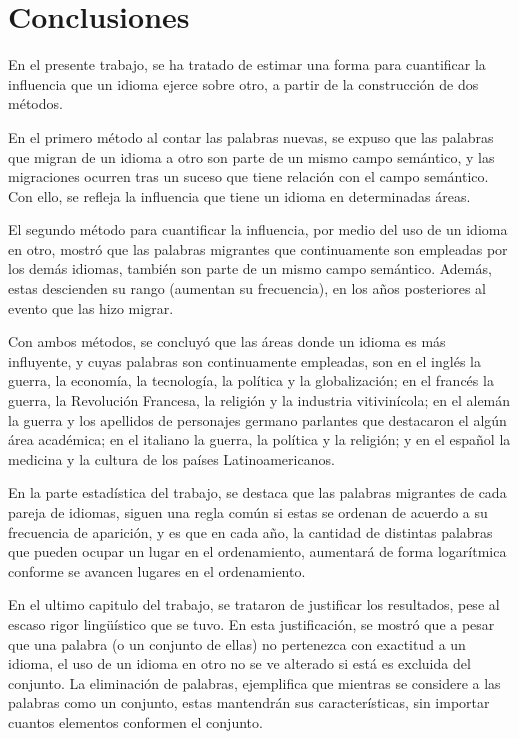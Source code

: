 \chapter{Conclusiones}

En el presente trabajo, se ha tratado de estimar una forma para cuantificar la influencia que un idioma ejerce sobre otro,  a partir de la construcción de dos métodos. 

En el primero método al contar las palabras nuevas, se expuso que las palabras que migran de un idioma a otro son parte de un mismo campo semántico, y las migraciones ocurren tras un suceso que tiene relación con el campo semántico. Con ello, se refleja la influencia que tiene un idioma en determinadas áreas.  

El segundo método para cuantificar la influencia, por medio del uso de un idioma en otro, mostró que las palabras migrantes que continuamente son empleadas por los demás idiomas, también son parte de un mismo campo semántico. Además, estas descienden su rango (aumentan su frecuencia), en los años posteriores al evento que las hizo migrar. 

Con ambos métodos, se concluyó que las áreas donde un idioma es más influyente, y cuyas palabras son continuamente empleadas, son en el inglés la guerra, la economía, la tecnología, la política y la globalización; en el francés la guerra, la Revolución Francesa, la religión y la industria vitivinícola; en el alemán la guerra y los apellidos de personajes germano parlantes que destacaron el algún área académica; en el italiano  la guerra, la política y la religión; y en el español la medicina y la cultura de los países Latinoamericanos. 

En la parte estadística del trabajo, se destaca que las palabras migrantes de cada pareja de idiomas, siguen una regla común si estas se ordenan de acuerdo a su frecuencia de aparición, y es que en cada año, la cantidad de distintas palabras que pueden ocupar un lugar en el ordenamiento, aumentará de forma logarítmica conforme se avancen lugares en el ordenamiento. 

En el ultimo capitulo del trabajo, se trataron de justificar los resultados, pese al escaso rigor lingüístico que se tuvo. En esta justificación, se mostró que a pesar que una palabra (o un conjunto de ellas) no pertenezca con exactitud a un idioma,  el uso de un idioma en otro no se ve alterado si está es excluida del conjunto. La eliminación de palabras, ejemplifica que mientras se considere a las palabras como un conjunto,  estas mantendrán sus características, sin importar cuantos elementos conformen el conjunto. 





